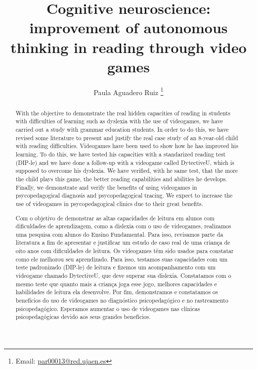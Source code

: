 \documentclass[english]{textolivre}
\title{Cognitive neuroscience: improvement of autonomous thinking in reading through video games}
\author[1]{Paula Aguadero Ruiz \orcid{0000-0001-5899-6267} \thanks{Email: \href{mailto:par00013@red.ujaen.es}{par00013@red.ujaen.es}}}
\affil[1]{Universidad de Jaén, Facultad de Humanidades y Ciencias de la Educación, Departamento Pedagogía, Jaén, España.}
\begin{document}
\maketitle

\begin{polyabstract}
\begin{abstract}
With the objective to demonstrate the real hidden capacities of reading in students with difficulties of learning such as dyslexia with the use of videogames, we have carried out a study with grammar education students. In order to do this, we have revised some literature to present and justify the real case study of an 8-year-old child with reading difficulties. Videogames have been used to show how he has improved his learning. To do this, we have tested his capacities with a standarized reading test (DIP-le) and we have done a follow-up with a videogame called DytectiveU, which is supposed to overcome his dyslexia. We have verified, with he same test, that the more the child plays this game, the better reading capabilities and abilities he develops. Finally, we demonstrate and verify the benefits of using videogames in psycopedagogical diagnosis and psycopedagogical tracing. We expect to increase the use of videogames in psycopedagogical clinics due to their great benefits.

\end{abstract}

\begin{portuguese}
\begin{abstract}
Com o objetivo de demonstrar as altas capacidades de leitura em alunos com dificuldades de aprendizagem, como a dislexia com o uso de videogames, realizamos uma pesquisa com alunos do Ensino Fundamental. Para isso, revisamos parte da literatura a fim de apresentar e justificar um estudo de caso real de uma criança de oito anos com dificuldades de leitura. Os videogames têm sido usados para constatar como ele melhorou seu aprendizado. Para isso, testamos suas capacidades com um teste padronizado (DIP-le) de leitura e fizemos um acompanhamento com um videogame chamado DytectiveU, que deve superar sua dislexia. Constatamos com o mesmo teste que quanto mais a criança joga esse jogo, melhores capacidades e habilidades de leitura ela desenvolve. Por fim, demonstramos e constatamos os benefícios do uso de videogames no diagnóstico psicopedagógico e no rastreamento psicopedagógico. Esperamos aumentar o uso de videogames nas clínicas psicopedagógicas devido aos seus grandes benefícios.

\end{abstract}
\end{portuguese}
\end{polyabstract}
\end{document}
